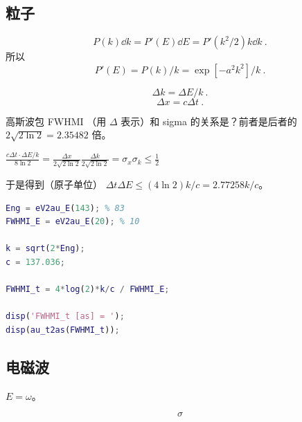 
\subsection{粒子}
\begin{equation}
P(k)\dd{k} = P'(E)\dd{E} = P'(k^2/2)k\dd{k}~.
\end{equation}
所以
\begin{equation}
P'(E) = P(k)/k = \exp[-a^2 k^2]/k~.
\end{equation}

\begin{equation}
\Delta k = \Delta E/k~.
\end{equation}
\begin{equation}
\Delta x = c\Delta t~.
\end{equation}


高斯波包 FWHMI （用 $\Delta$ 表示）和 sigma 的关系是？前者是后者的 $2\sqrt{2\ln 2} = 2.35482$ 倍。

$\frac{c\Delta t \cdot \Delta E/k}{8\ln 2} = \frac{\Delta x}{2\sqrt{2\ln 2}}\frac{\Delta k}{2\sqrt{2\ln 2}} = \sigma_x \sigma_k \leq \frac{1}{2}$

于是得到（原子单位） $\Delta t\Delta E \leq (4\ln 2)k/c = 2.77258 k/c$。

\begin{lstlisting}[language=matlab]
Eng = eV2au_E(143); % 83
FWHMI_E = eV2au_E(20); % 10

k = sqrt(2*Eng);
c = 137.036;

FWHMI_t = 4*log(2)*k/c / FWHMI_E;

disp('FWHMI_t [as] = ');
disp(au_t2as(FWHMI_t));
\end{lstlisting}

\subsection{电磁波}
$E = \omega$。

\begin{equation}
\sigma
\end{equation}

